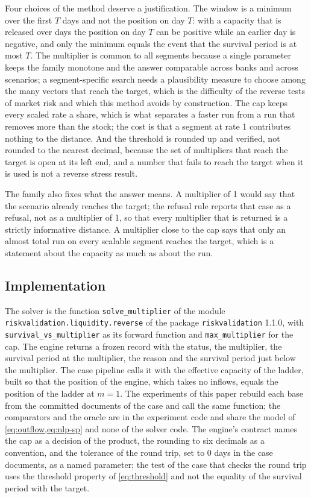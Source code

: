 Four choices of the method deserve a justification. The window is a minimum over the first $T$ days and not the position on day $T$: with a capacity that is released over days the position on day $T$ can be positive while an earlier day is negative, and only the minimum equals the event that the survival period is at most $T$. The multiplier is common to all segments because a single parameter keeps the family monotone and the answer comparable across banks and across scenarios; a segment-specific search needs a plausibility measure to choose among the many vectors that reach the target, which is the difficulty of the reverse tests of market risk and which this method avoids by construction. The cap keeps every scaled rate a share, which is what separates a faster run from a run that removes more than the stock; the cost is that a segment at rate 1 contributes nothing to the distance. And the threshold is rounded up and verified, not rounded to the nearest decimal, because the set of multipliers that reach the target is open at its left end, and a number that fails to reach the target when it is used is not a reverse stress result.

The family also fixes what the answer means. A multiplier of 1 would say that the scenario already reaches the target; the refusal rule reports that case as a refusal, not as a multiplier of 1, so that every multiplier that is returned is a strictly informative distance. A multiplier close to the cap says that only an almost total run on every scalable segment reaches the target, which is a statement about the capacity as much as about the run.

\subsection{Implementation}

The solver is the function \texttt{solve\_multiplier} of the module \texttt{riskvalidation.liquidity.\allowbreak reverse} of the package \texttt{riskvalidation} 1.1.0, with \texttt{survival\_vs\_multiplier} as its forward function and \texttt{max\_multiplier} for the cap. The engine returns a frozen record with the status, the multiplier, the survival period at the multiplier, the reason and the survival period just below the multiplier. The case pipeline calls it with the effective capacity of the ladder, built so that the position of the engine, which takes no inflows, equals the position of the ladder at $m=1$. The experiments of this paper rebuild each base from the committed documents of the case and call the same function; the comparators and the oracle are in the experiment code and share the model of \cref{eq:outflow,eq:nlp-sp} and none of the solver code. The engine's contract names the cap as a decision of the product, the rounding to six decimals as a convention, and the tolerance of the round trip, set to 0 days in the case documents, as a named parameter; the test of the case that checks the round trip uses the threshold property of \cref{eq:threshold} and not the equality of the survival period with the target.
